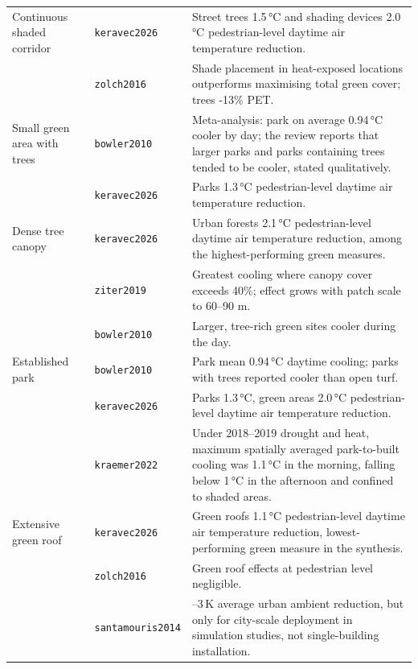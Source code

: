 \begin{longtable}{@{}>{\raggedright\arraybackslash}p{30mm} l
                    >{\raggedright\arraybackslash}p{72mm}@{}}
\addlinespace
Continuous shaded corridor & \texttt{keravec2026} &
Street trees 1.5\,\si{\degreeCelsius} and shading devices 2.0\,\si{\degreeCelsius} pedestrian-level daytime air temperature reduction. \\
 & \texttt{zolch2016} &
Shade placement in heat-exposed locations outperforms maximising total green cover; trees -13\% PET. \\
\addlinespace
Small green area with trees & \texttt{bowler2010} &
Meta-analysis: park on average 0.94\,\si{\degreeCelsius} cooler by day; the review reports that larger parks and parks containing trees tended to be cooler, stated qualitatively. \\
 & \texttt{keravec2026} &
Parks 1.3\,\si{\degreeCelsius} pedestrian-level daytime air temperature reduction. \\
\addlinespace
Dense tree canopy & \texttt{keravec2026} &
Urban forests 2.1\,\si{\degreeCelsius} pedestrian-level daytime air temperature reduction, among the highest-performing green measures. \\
 & \texttt{ziter2019} &
Greatest cooling where canopy cover exceeds 40\%; effect grows with patch scale to 60--90 m. \\
 & \texttt{bowler2010} &
Larger, tree-rich green sites cooler during the day. \\
\addlinespace
Established park & \texttt{bowler2010} &
Park mean 0.94\,\si{\degreeCelsius} daytime cooling; parks with trees reported cooler than open turf. \\
 & \texttt{keravec2026} &
Parks 1.3\,\si{\degreeCelsius}, green areas 2.0\,\si{\degreeCelsius} pedestrian-level daytime air temperature reduction. \\
 & \texttt{kraemer2022} &
Under 2018--2019 drought and heat, maximum spatially averaged park-to-built cooling was 1.1\,\si{\degreeCelsius} in the morning, falling below 1\,\si{\degreeCelsius} in the afternoon and confined to shaded areas. \\
\addlinespace
Extensive green roof & \texttt{keravec2026} &
Green roofs 1.1\,\si{\degreeCelsius} pedestrian-level daytime air temperature reduction, lowest-performing green measure in the synthesis. \\
 & \texttt{zolch2016} &
Green roof effects at pedestrian level negligible. \\
 & \texttt{santamouris2014} &
0.3--3\,\si{\kelvin} average urban ambient reduction, but only for city-scale deployment in simulation studies, not single-building installation. \\

\end{longtable}
